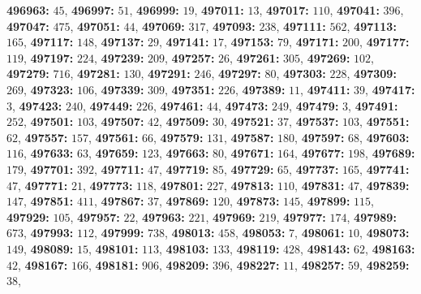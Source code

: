 \textsf{\bfseries 496963:} $45$, \textsf{\bfseries 496997:} $51$, \textsf{\bfseries 496999:} $19$, \textsf{\bfseries 497011:} $13$, \textsf{\bfseries 497017:} $110$, \textsf{\bfseries 497041:} $396$, \textsf{\bfseries 497047:} $475$, \textsf{\bfseries 497051:} $44$, \textsf{\bfseries 497069:} $317$, \textsf{\bfseries 497093:} $238$, \textsf{\bfseries 497111:} $562$, \textsf{\bfseries 497113:} $165$, \textsf{\bfseries 497117:} $148$, \textsf{\bfseries 497137:} $29$, \textsf{\bfseries 497141:} $17$, \textsf{\bfseries 497153:} $79$, \textsf{\bfseries 497171:} $200$, \textsf{\bfseries 497177:} $119$, \textsf{\bfseries 497197:} $224$, \textsf{\bfseries 497239:} $209$, \textsf{\bfseries 497257:} $26$, \textsf{\bfseries 497261:} $305$, \textsf{\bfseries 497269:} $102$, \textsf{\bfseries 497279:} $716$, \textsf{\bfseries 497281:} $130$, \textsf{\bfseries 497291:} $246$, \textsf{\bfseries 497297:} $80$, \textsf{\bfseries 497303:} $228$, \textsf{\bfseries 497309:} $269$, \textsf{\bfseries 497323:} $106$, \textsf{\bfseries 497339:} $309$, \textsf{\bfseries 497351:} $226$, \textsf{\bfseries 497389:} $11$, \textsf{\bfseries 497411:} $39$, \textsf{\bfseries 497417:} $3$, \textsf{\bfseries 497423:} $240$, \textsf{\bfseries 497449:} $226$, \textsf{\bfseries 497461:} $44$, \textsf{\bfseries 497473:} $249$, \textsf{\bfseries 497479:} $3$, \textsf{\bfseries 497491:} $252$, \textsf{\bfseries 497501:} $103$, \textsf{\bfseries 497507:} $42$, \textsf{\bfseries 497509:} $30$, \textsf{\bfseries 497521:} $37$, \textsf{\bfseries 497537:} $103$, \textsf{\bfseries 497551:} $62$, \textsf{\bfseries 497557:} $157$, \textsf{\bfseries 497561:} $66$, \textsf{\bfseries 497579:} $131$, \textsf{\bfseries 497587:} $180$, \textsf{\bfseries 497597:} $68$, \textsf{\bfseries 497603:} $116$, \textsf{\bfseries 497633:} $63$, \textsf{\bfseries 497659:} $123$, \textsf{\bfseries 497663:} $80$, \textsf{\bfseries 497671:} $164$, \textsf{\bfseries 497677:} $198$, \textsf{\bfseries 497689:} $179$, \textsf{\bfseries 497701:} $392$, \textsf{\bfseries 497711:} $47$, \textsf{\bfseries 497719:} $85$, \textsf{\bfseries 497729:} $65$, \textsf{\bfseries 497737:} $165$, \textsf{\bfseries 497741:} $47$, \textsf{\bfseries 497771:} $21$, \textsf{\bfseries 497773:} $118$, \textsf{\bfseries 497801:} $227$, \textsf{\bfseries 497813:} $110$, \textsf{\bfseries 497831:} $47$, \textsf{\bfseries 497839:} $147$, \textsf{\bfseries 497851:} $411$, \textsf{\bfseries 497867:} $37$, \textsf{\bfseries 497869:} $120$, \textsf{\bfseries 497873:} $145$, \textsf{\bfseries 497899:} $115$, \textsf{\bfseries 497929:} $105$, \textsf{\bfseries 497957:} $22$, \textsf{\bfseries 497963:} $221$, \textsf{\bfseries 497969:} $219$, \textsf{\bfseries 497977:} $174$, \textsf{\bfseries 497989:} $673$, \textsf{\bfseries 497993:} $112$, \textsf{\bfseries 497999:} $738$, \textsf{\bfseries 498013:} $458$, \textsf{\bfseries 498053:} $7$, \textsf{\bfseries 498061:} $10$, \textsf{\bfseries 498073:} $149$, \textsf{\bfseries 498089:} $15$, \textsf{\bfseries 498101:} $113$, \textsf{\bfseries 498103:} $133$, \textsf{\bfseries 498119:} $428$, \textsf{\bfseries 498143:} $62$, \textsf{\bfseries 498163:} $42$, \textsf{\bfseries 498167:} $166$, \textsf{\bfseries 498181:} $906$, \textsf{\bfseries 498209:} $396$, \textsf{\bfseries 498227:} $11$, \textsf{\bfseries 498257:} $59$, \textsf{\bfseries 498259:} $38$, 

